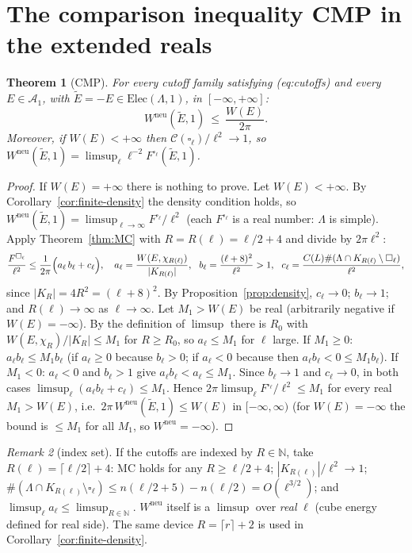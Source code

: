 \documentclass[11pt]{article}
\newtheorem{theorem}{Theorem}[section]
\theoremstyle{definition}
\theoremstyle{remark}
\newtheorem{remark}[theorem]{Remark}
\newcommand{\Lam}{\Lambda}
\newcommand{\tE}{\widetilde E}
\newcommand{\Wneu}{W^{\mathrm{neu}}}
\begin{document}
\section{The comparison inequality CMP in the extended reals}

\begin{theorem}[CMP]\label{thm:CMP}
For every cutoff family satisfying (eq:cutoffs) and every $E\in\mathcal A_1$, with $\tE=-E\in\mathrm{Elec}(\Lam,1)$, in $[-\infty,+\infty]$:
\[
\Wneu(\tE,1)\ \le\ \frac{W(E)}{2\pi}.
\]
Moreover, if $W(E)<+\infty$ then $\mathcal C(\square_\ell)/\ell^2\to1$, so $\Wneu(\tE,1)=\limsup_\ell\ell^{-2}F^{\square_\ell}(\tE,1)$.
\end{theorem}
\begin{proof}
If $W(E)=+\infty$ there is nothing to prove.  Let $W(E)<+\infty$.  By Corollary~\ref{cor:finite-density} the density condition holds, so $\Wneu(\tE,1)=\limsup_{\ell\to\infty}F^{\square_\ell}/\ell^2$ (each $F^{\square_\ell}$ is a real number: $\Lam$ is simple).  Apply Theorem~\ref{thm:MC} with $R=R(\ell)=\ell/2+4$ and divide by $2\pi\ell^2$:
\[
\frac{F^{\square_\ell}}{\ell^2}\le\frac1{2\pi}\Bigl(a_\ell\,b_\ell+c_\ell\Bigr),\quad a_\ell=\frac{W(E,\chi_{R(\ell)})}{|K_{R(\ell)}|},\ \ b_\ell=\frac{(\ell+8)^2}{\ell^2}>1,\ \ c_\ell=\frac{C(L)\#(\Lam\cap K_{R(\ell)}\setminus\square_\ell)}{\ell^2},
\]
since $|K_R|=4R^2=(\ell+8)^2$.  By Proposition~\ref{prop:density}, $c_\ell\to0$; $b_\ell\to1$; and $R(\ell)\to\infty$ as $\ell\to\infty$.
Let $M_1>W(E)$ be real (arbitrarily negative if $W(E)=-\infty$).  By the definition of $\limsup$ there is $R_0$ with $W(E,\chi_R)/|K_R|\le M_1$ for $R\ge R_0$, so $a_\ell\le M_1$ for $\ell$ large.  If $M_1\ge0$: $a_\ell b_\ell\le M_1b_\ell$ (if $a_\ell\ge0$ because $b_\ell>0$; if $a_\ell<0$ because then $a_\ell b_\ell<0\le M_1b_\ell$).  If $M_1<0$: $a_\ell<0$ and $b_\ell>1$ give $a_\ell b_\ell<a_\ell\le M_1$.  Since $b_\ell\to1$ and $c_\ell\to0$, in both cases $\limsup_\ell(a_\ell b_\ell+c_\ell)\le M_1$.  Hence $2\pi\limsup_\ell F^{\square_\ell}/\ell^2\le M_1$ for every real $M_1>W(E)$, i.e.\ $2\pi\,\Wneu(\tE,1)\le W(E)$ in $[-\infty,\infty)$ (for $W(E)=-\infty$ the bound is $\le M_1$ for all $M_1$, so $\Wneu=-\infty$).
\end{proof}

\begin{remark}[index set]\label{rem:index}
If the cutoffs are indexed by $R\in\mathbb N$, take $R(\ell)=\lceil\ell/2\rceil+4$: MC holds for any $R\ge\ell/2+4$; $|K_{R(\ell)}|/\ell^2\to1$; $\#(\Lam\cap K_{R(\ell)}\setminus\square_\ell)\le n(\ell/2+5)-n(\ell/2)=O(\ell^{3/2})$; and $\limsup_\ell a_\ell\le\limsup_{R\in\mathbb N}$.  $\Wneu$ itself is a $\limsup$ over \emph{real} $\ell$ (cube energy defined for real side).  The same device $R=\lceil r\rceil+2$ is used in Corollary~\ref{cor:finite-density}.
\end{remark}
\end{document}
